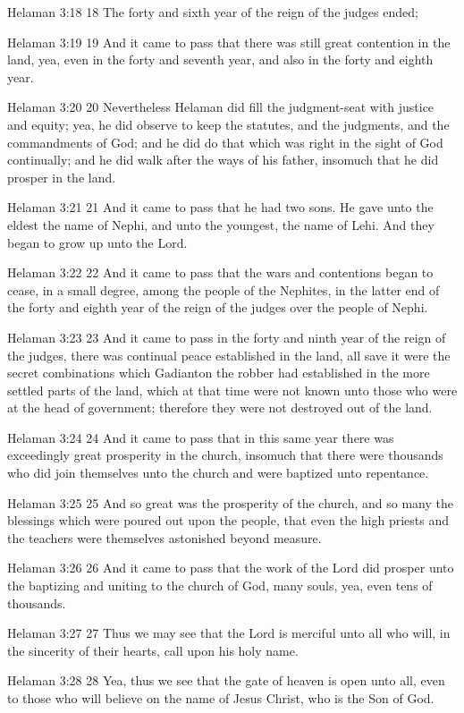 Helaman 3:18
 18 The forty and sixth year of the reign of the judges ended;

Helaman 3:19
 19 And it came to pass that there was still great contention in
the land, yea, even in the forty and seventh year, and also in
the forty and eighth year.

Helaman 3:20
 20 Nevertheless Helaman did fill the judgment-seat with justice
and equity; yea, he did observe to keep the statutes, and the
judgments, and the commandments of God; and he did do that which
was right in the sight of God continually; and he did walk after
the ways of his father, insomuch that he did prosper in the land.

Helaman 3:21
 21 And it came to pass that he had two sons. He gave unto the
eldest the name of Nephi, and unto the youngest, the name of
Lehi. And they began to grow up unto the Lord.

Helaman 3:22
 22 And it came to pass that the wars and contentions began to
cease, in a small degree, among the people of the Nephites, in
the latter end of the forty and eighth year of the reign of the
judges over the people of Nephi.

Helaman 3:23
 23 And it came to pass in the forty and ninth year of the reign
of the judges, there was continual peace established in the land,
all save it were the secret combinations which Gadianton the
robber had established in the more settled parts of the land,
which at that time were not known unto those who were at the head
of government; therefore they were not destroyed out of the land.

Helaman 3:24
 24 And it came to pass that in this same year there was
exceedingly great prosperity in the church, insomuch that there
were thousands who did join themselves unto the church and were
baptized unto repentance.

Helaman 3:25
 25 And so great was the prosperity of the church, and so many
the blessings which were poured out upon the people, that even
the high priests and the teachers were themselves astonished
beyond measure.

Helaman 3:26
 26 And it came to pass that the work of the Lord did prosper
unto the baptizing and uniting to the church of God, many souls,
yea, even tens of thousands.

Helaman 3:27
 27 Thus we may see that the Lord is merciful unto all who will,
in the sincerity of their hearts, call upon his holy name.

Helaman 3:28
 28 Yea, thus we see that the gate of heaven is open unto all,
even to those who will believe on the name of Jesus Christ, who
is the Son of God.


